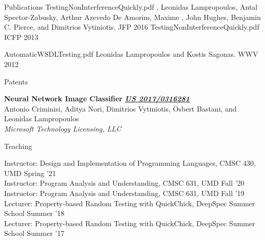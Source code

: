 \documentclass{resume} %
\begin{document}
\begin{rSection}{Publications}
    {TestingNonInterferenceQuickly.pdf}
    {\Catalin \Hritcu, Leonidas Lampropoulos, Antal Spector-Zabusky, Arthur
    Azevedo De Amorim, Maxime \Denes, John Hughes, Benjamin C. Pierce, and Dimitrios
    Vytiniotis.}
    {JFP 2016}
    {TestingNonInterferenceQuickly.pdf}
    {ICFP 2013}
%

    {AutomaticWSDLTesting.pdf}
    {Leonidas Lampropoulos and Kostis Sagonas.}
    {WWV 2012}
   
\end{rSection}

\clearpage


\begin{rSection}{Patents}

{\bf Neural Network Image Classifier} \hfill {\href{https://patentimages.storage.googleapis.com/44/ec/9f/3f90c94a602fda/US20170316281A1.pdf}{\bf \em US 2017/0316281}}\\
Antonio Criminisi, Aditya Nori, Dimitrios Vytiniotis, Osbert Bastani, and Leonidas Lampropoulos\\
{\em Microsoft Technology Licensing, LLC}

  
\end{rSection}


\newcommand{\teach}[3]{
  {#1: #2} \hfill #3 \\
  }

\begin{rSection}{Teaching}

  \teach{Instructor}{Design and Implementation of Programming Languages, CMSC 430, UMD}{Spring '21}  
  \teach{Instructor}{Program Analysis and Understanding, CMSC 631, UMD}{Fall '20}
  \teach{Instructor}{Program Analysis and Understanding, CMSC 631, UMD}{Fall '19}
  \teach{Lecturer}{Property-based Random Testing with QuickChick, DeepSpec Summer School}{Summer '18}
  \teach{Lecturer}{Property-based Random Testing with QuickChick, DeepSpec Summer School}{Summer '17}  
\end{rSection}
\end{document}
